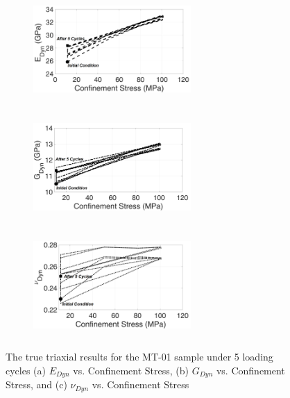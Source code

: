 \begin{figure}[ht!]
\centering
\begin{subfigure}[c]{0.48\textwidth}
\centering
\includegraphics[width=6cm,height=4cm]{figures/Amir_TrueTriaxial_MT_01_Result_E.png}
\subcaption{}
\end{subfigure}
\hfill
\begin{subfigure}[c]{0.48\textwidth}
\centering
\includegraphics[width=6cm,height=4cm]{figures/Amir_TrueTriaxial_MT_01_Result_G.png}
\subcaption{}
\end{subfigure}
\hfill
\begin{subfigure}[c]{0.48\textwidth}
\centering
\includegraphics[width=6cm,height=4cm]{figures/Amir_TrueTriaxial_MT_01_Result_Nu.png}
\subcaption{}
\end{subfigure}
\caption{The true triaxial results for the MT-01 sample under 5 loading cycles (a) $E_{Dyn}$ vs. Confinement Stress, (b) $G_{Dyn}$ vs. Confinement Stress, and (c) $\nu_{Dyn}$ vs. Confinement Stress}
\label{fig:Amir_TrueTriaxial_MT_01_Result}
\end{figure}

